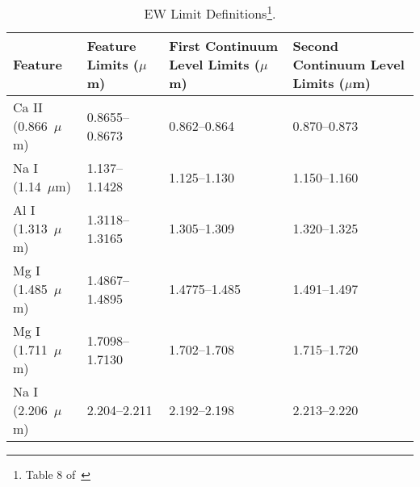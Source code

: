 \begin{table}[H]
    \caption{EW Limit Definitions\footnote{Table 8 of~\cite{Rayner_2009}}.}
	\begin{tabular}{l|l|l|l}
	\label{tab:features}
		Feature & Feature Limits ($\mu$m) & First Continuum Level Limits ($\mu$m) & Second Continuum Level Limits ($\mu$m) \\ \hline
		Ca II (0.866~$\mu$m) & 0.8655--0.8673 & 0.862--0.864 & 0.870--0.873 \\
		Na I (1.14~$\mu$m) & 1.137--1.1428 & 1.125--1.130 & 1.150--1.160 \\
		Al I (1.313~$\mu$m) & 1.3118--1.3165 & 1.305--1.309 & 1.320--1.325 \\
		Mg I (1.485~$\mu$m) & 1.4867--1.4895 & 1.4775--1.485 & 1.491--1.497 \\
		Mg I (1.711~$\mu$m) & 1.7098--1.7130 & 1.702--1.708 & 1.715--1.720 \\
		Na I (2.206~$\mu$m) & 2.204--2.211 & 2.192--2.198 & 2.213--2.220 \\
	\end{tabular}
\end{table}